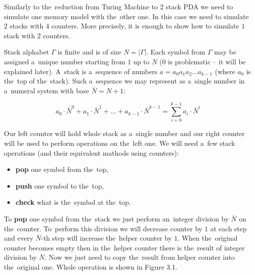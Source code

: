 \documentclass[english,shortabstract,mgr]{iithesis}
\begin{document}
Similarly to the~reduction from Turing Machine to 2 stack PDA we need to simulate
one memory model with the~other one. In this case we need to simulate $2$ stacks
with $4$ counters. More precisely, it is enough to show how to simulate $1$ stack
with $2$ counters.

Stack alphabet $\Gamma$ is finite and is of size $N = |\Gamma|$. Each symbol from $\Gamma$ may
be assigned a~unique number starting from $1$ up to $N$ ($0$ is problematic -- it will be
explained later). A~stack is a~sequence of numbers $a = a_0 a_1 a_2 \dots a_{k-1}$ (where $a_0$
is the~top of the~stack). Such a~sequence we may represent as a~single number in a~numeral system
with base $\bar{N} = N+1$:

$$ a_0 \cdot \bar{N}^0 + a_1 \cdot \bar{N}^1 + \dots + a_{k-1} \cdot \bar{N}^{k-1}
    = \sum_{i=0}^{k-1} a_i \cdot \bar{N}^i $$

Our left counter will hold whole stack as a~single number and our right counter will be used
to perform operations on the~left one. We will need a~few stack operations (and their equivalent
mathods using counters):
\begin{itemize}
  \item \textbf{pop} one symbol from the~top,
  \item \textbf{push} one symbol to the~top,
  \item \textbf{check} what is the~symbol at the~top.
\end{itemize}

To \textbf{pop} one symbol from the~stack we just perform an~integer division by $\bar{N}$ on
the~counter. To~perform this division we will decrease counter by $1$ at each step and every
$\bar{N}$-th step will increase the~helper counter by $1$. When the~original counter becomes empty
then in the~helper counter there is the~result of integer division by $\bar{N}$. Now we just
need to copy the~result from helper counter into the~original one. Whole operation is shown in
Figure 3.1.
\end{document}
